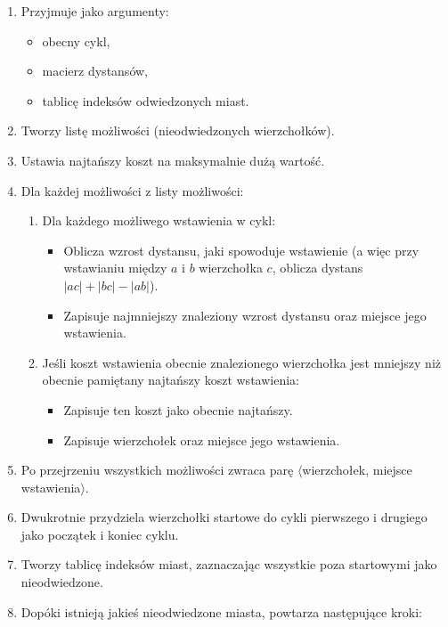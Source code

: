 \documentclass[11pt]{article}
\begin{document}
\begin{enumerate}
    \item Przyjmuje jako argumenty:
    \begin{itemize}
        \item obecny cykl,
        \item macierz dystansów,
        \item tablicę indeksów odwiedzonych miast.
    \end{itemize}
    \item Tworzy listę możliwości (nieodwiedzonych wierzchołków).
    \item Ustawia najtańszy koszt na maksymalnie dużą wartość.
    \item Dla każdej możliwości z listy możliwości:
    \begin{enumerate}
        \item Dla każdego możliwego wstawienia w cykl:
        \begin{itemize}
            \item Oblicza wzrost dystansu, jaki spowoduje wstawienie (a więc przy wstawianiu między \(a\) i \(b\) wierzchołka \(c\), oblicza dystans \(|ac| + |bc| - |ab|\)).
            \item Zapisuje najmniejszy znaleziony wzrost dystansu oraz miejsce jego wstawienia.
        \end{itemize}
        \item Jeśli koszt wstawienia obecnie znalezionego wierzchołka jest mniejszy niż obecnie pamiętany najtańszy koszt wstawienia:
        \begin{itemize}
            \item Zapisuje ten koszt jako obecnie najtańszy.
            \item Zapisuje wierzchołek oraz miejsce jego wstawienia.
        \end{itemize}
    \end{enumerate}
    \item Po przejrzeniu wszystkich możliwości zwraca parę \(\langle\)wierzchołek, miejsce wstawienia\(\rangle\).
    \item Dwukrotnie przydziela wierzchołki startowe do cykli pierwszego i drugiego jako początek i koniec cyklu.
    \item Tworzy tablicę indeksów miast, zaznaczając wszystkie poza startowymi jako nieodwiedzone.
    \item Dopóki istnieją jakieś nieodwiedzone miasta, powtarza następujące kroki:
    \begin{enumerate}

\end{enumerate}
\end{enumerate}
\end{document}
